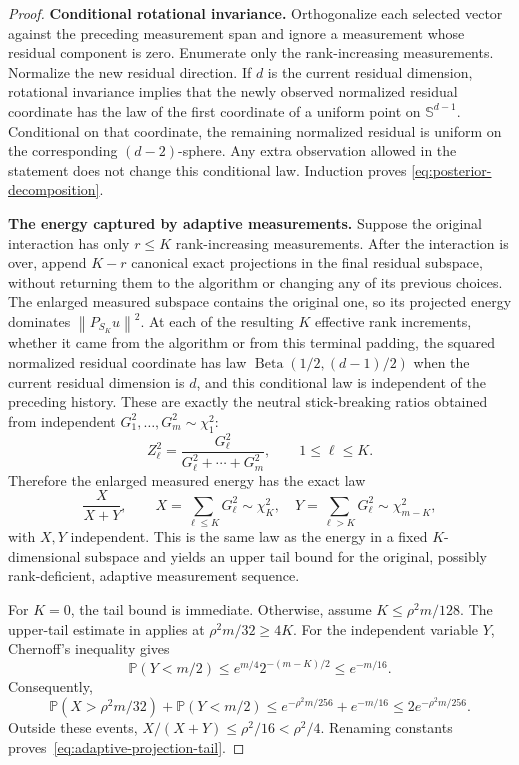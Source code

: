 \documentclass[11pt]{article}
\newcommand{\Pp}{\mathbb P}
\newcommand{\norm}[1]{\left\lVert #1\right\rVert}
\theoremstyle{definition}
\theoremstyle{remark}
\begin{document}
\begin{proof}
\noindent\textbf{Conditional rotational invariance.}
Orthogonalize each selected vector against the preceding measurement span and
ignore a measurement whose residual component is zero.  Enumerate only the
rank-increasing measurements.  Normalize the new residual direction.  If $d$
is the current residual dimension, rotational invariance implies that the
newly observed normalized residual coordinate has the law of the first
coordinate of a uniform point on $\mathbb S^{d-1}$.  Conditional on that
coordinate, the remaining normalized residual is uniform on the corresponding
$(d-2)$-sphere.  Any extra observation allowed in the statement does not
change this conditional law.  Induction proves
\eqref{eq:posterior-decomposition}.

\noindent\textbf{The energy captured by adaptive measurements.}
Suppose the original interaction has only $r\le K$ rank-increasing
measurements.  After the interaction is over, append $K-r$ canonical exact
projections in the final residual subspace, without returning them to the
algorithm or changing any of its previous choices.  The enlarged measured
subspace contains the original one, so its projected energy dominates
$\norm{P_{S_K}u}^2$.  At each of the resulting $K$ effective rank increments,
whether it came from the algorithm or from this terminal padding, the squared
normalized residual coordinate has law
$\operatorname{Beta}(1/2,(d-1)/2)$ when the current residual dimension is $d$,
and this conditional law is independent of the preceding history.  These are
exactly the neutral stick-breaking ratios obtained from independent
$G_1^2,\ldots,G_m^2\sim\chi_1^2$:
\[
 Z_\ell^2=\frac{G_\ell^2}{G_\ell^2+\cdots+G_m^2},
 \qquad 1\le\ell\le K.
\]
Therefore the enlarged measured energy has the exact law
\begin{equation}\label{eq:adaptive-beta}
 \frac{X}{X+Y},
 \qquad X=\sum_{\ell\le K}G_\ell^2\sim\chi_K^2,
 \quad Y=\sum_{\ell>K}G_\ell^2\sim\chi_{m-K}^2,
\end{equation}
with $X,Y$ independent.  This is the same law as the energy in a fixed
$K$-dimensional subspace and yields an upper tail bound for the original,
possibly rank-deficient, adaptive measurement sequence.

For $K=0$, the tail bound is immediate.  Otherwise, assume
$K\le\rho^2m/128$.  The upper-tail estimate in  applies
at $\rho^2m/32\ge4K$.  For the independent variable $Y$, Chernoff's
inequality gives
\[
 \Pp(Y<m/2)\le e^{m/4}2^{-(m-K)/2}\le e^{-m/16}.
\]
Consequently,
\[
 \Pp(X>\rho^2m/32)+\Pp(Y<m/2)
 \le e^{-\rho^2m/256}+e^{-m/16}
 \le 2e^{-\rho^2m/256}.
\]
Outside these events, $X/(X+Y)\le\rho^2/16<\rho^2/4$.  Renaming constants
proves~\eqref{eq:adaptive-projection-tail}.
\end{proof}
\end{document}
